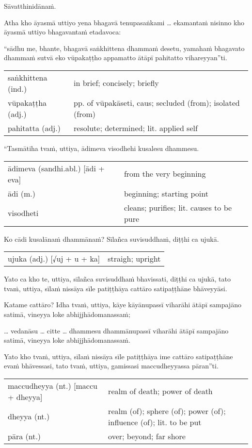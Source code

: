 \documentclass[11pt,oneside]{memoir}
\begin{document}
Sāvatthinidānaṁ.

Atha kho āyasmā uttiyo yena bhagavā tenupasaṅkami \ldots{} ekamantaṁ nisinno kho āyasmā uttiyo bhagavantaṁ etadavoca:

“sādhu me, bhante, bhagavā saṅkhittena dhammaṁ desetu, yamahaṁ bhagavato dhammaṁ sutvā eko vūpakaṭṭho appamatto ātāpī pahitatto vihareyyan”ti.

\begin{longtable}{L{\colOne} L{\colTwo}}
saṅkhittena (ind.) & in brief; concisely; briefly\\[0pt]
vūpakaṭṭha (adj.) & pp. of vūpakāseti, caus; secluded (from); isolated (from)\\[0pt]
pahitatta (adj.) & resolute; determined; lit. applied self\\[0pt]
\end{longtable}

“Tasmātiha tvaṁ, uttiya, ādimeva visodhehi kusalesu dhammesu.

\begin{longtable}{L{\colOne} L{\colTwo}}
ādimeva (sandhi.abl.) [ādi + eva] & from the very beginning\\[0pt]
ādi (m.) & beginning; starting point\\[0pt]
visodheti & cleans; purifies; lit. causes to be pure\\[0pt]
\end{longtable}

Ko cādi kusalānaṁ dhammānaṁ? Sīlañca suvisuddhaṁ, diṭṭhi ca ujukā.

\begin{longtable}{L{\colOne} L{\colTwo}}
ujuka (adj.)  [√uj + u + ka] & straigh; upright\\[0pt]
\end{longtable}

Yato ca kho te, uttiya, sīlañca suvisuddhaṁ bhavissati, diṭṭhi ca ujukā, tato
tvaṁ, uttiya, sīlaṁ nissāya sīle patiṭṭhāya cattāro satipaṭṭhāne bhāveyyāsi.

Katame cattāro? Idha tvaṁ, uttiya, kāye kāyānupassī viharāhi ātāpī sampajāno satimā, vineyya loke abhijjhādomanassaṁ;

\ldots{} vedanāsu \ldots{} citte \ldots{} dhammesu dhammānupassī viharāhi ātāpī sampajāno satimā, vineyya loke abhijjhādomanassaṁ.

Yato kho tvaṁ, uttiya, sīlaṁ nissāya sīle patiṭṭhāya ime cattāro satipaṭṭhāne
evaṁ bhāvessasi, tato tvaṁ, uttiya, gamissasi maccudheyyassa pāran”ti.

\begin{longtable}{L{\colOne} L{\colTwo}}
maccudheyya (nt.) [maccu + dheyya] & realm of death; power of death\\[0pt]
dheyya (nt.) & realm (of); sphere (of); power (of); influence (of); lit. to be put\\[0pt]
pāra (nt.) & over; beyond; far shore\\[0pt]
\end{longtable}
\end{document}
